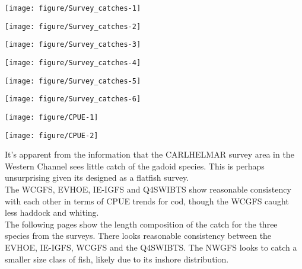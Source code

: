 \documentclass[12pt]{article}\usepackage[]{graphicx}\usepackage[]{color}
\newenvironment{knitrout}{}{} %
\begin{document}
\begin{landscape}

\begin{knitrout}\footnotesize
{}\color{fgcolor}
\texttt{[image: figure/Survey\_catches-1]} 

\texttt{[image: figure/Survey\_catches-2]} 

\texttt{[image: figure/Survey\_catches-3]} 

\texttt{[image: figure/Survey\_catches-4]} 

\texttt{[image: figure/Survey\_catches-5]} 

\texttt{[image: figure/Survey\_catches-6]} 

\end{knitrout}

\begin{knitrout}\footnotesize
{}\color{fgcolor}
\texttt{[image: figure/CPUE-1]} 

\texttt{[image: figure/CPUE-2]} 

\end{knitrout}

\end{landscape}

It's apparent from the information that the CARLHELMAR survey area in the
Western Channel sees little catch of the gadoid species. This is perhaps
unsurprising given its designed as a flatfish survey. \\

The WCGFS, EVHOE, IE-IGFS and Q4SWIBTS show reasonable consistency with each
other in terms of CPUE trends for cod, though the WCGFS caught less haddock and
whiting. \\

The following pages show the length composition of the catch for the three
species from the surveys. There looks reasonable consistency between the EVHOE,
IE-IGFS, WCGFS and the Q4SWIBTS. The NWGFS looks to catch a smaller size class
of fish, likely due to its inshore distribution. \\
\end{document}
